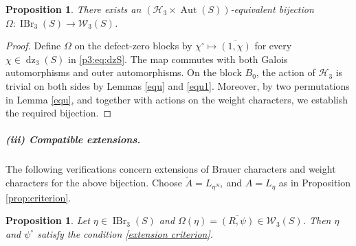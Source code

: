 \documentclass[11pt,a4paper]{article}
\numberwithin{equation}{section}
\newtheorem{proposition}[theorem]{Proposition}
\theoremstyle{definition}
\theoremstyle{remark}
\newcommand{\IBr}{\operatorname{IBr}}
\newcommand{\Aut}{\operatorname{Aut}}
\newcommand{\dz}{\operatorname{dz}}
\newcommand{\HH}{\mathcal H}
\newcommand{\WW}{\mathcal W}
\newcommand{\AT}{\widetilde A}
\begin{document}
\begin{proposition}\label{p3:prop:equivariant}
There exists an 
\((\HH_3\times\Aut(S))\)-equivalent bijection 
\(\Omega:\IBr_3(S)\longrightarrow\mathcal W_3(S)\).
\end{proposition}
\begin{proof}
Define \(\Omega\) on the defect-zero blocks by
$\chi^\circ\mapsto\overline{(1,\chi)}$ for every $\chi\in\dz_3(S)$ in \eqref{p3:eq:dzS}. The map commutes with both Galois automorphisms and outer automorphisms. On the block \(B_0\), the action of $\HH_3$ is trivial on both sides by Lemmas \ref{equ} and \ref{equ1}. Moreover, by two permutations
in Lemma \ref{equ}, and together with actions on the weight characters, we  establish the required bijection.
\end{proof}

\subparagraph{(iii) Compatible extensions.}
The following verifications concern extensions of Brauer characters and weight characters for the above bijection. Choose \(\AT=L_{\eta^{\HH_3}}\) and \(A=L_\eta\) as in Proposition \ref{prop:criterion}.
\begin{proposition}\label{thm:p3}
Let $\eta\in\IBr_3(S)$ and $\Omega(\eta)=\overline{(R,\psi)}\in\WW_3(S)$.
Then $\eta$ and $\psi^\circ$ satisfy the condition \eqref{extension criterion}.
\end{proposition}
\end{document}
